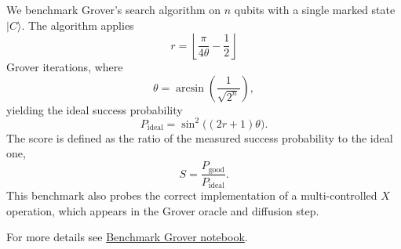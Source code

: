 We benchmark Grover's search algorithm on \(n\) qubits with a single marked state \(|C\rangle\). The algorithm applies
\[
r = \left\lfloor \frac{\pi}{4\theta} - \frac{1}{2} \right\rfloor
\]
Grover iterations, where
\[
\theta = \arcsin\!\left(\frac{1}{\sqrt{2^n}}\right),
\]
yielding the ideal success probability
\[
P_{\mathrm{ideal}} = \sin^2\!\bigl((2r+1)\theta\bigr).
\]
The score is defined as the ratio of the measured success probability to the ideal one,
\[
S = \frac{P_{\mathrm{good}}}{P_{\mathrm{ideal}}}.
\]
This benchmark also probes the correct implementation of a multi-controlled \(X\) operation, which appears in the Grover oracle and diffusion step.
\smallskip

For more details see \href{https://github.com/softqlib/softqlib-quantum-algorithms/tree/main/benchmarking/benchmarks/benchmark\_grover.ipynb}{Benchmark Grover notebook}.
\medskip
